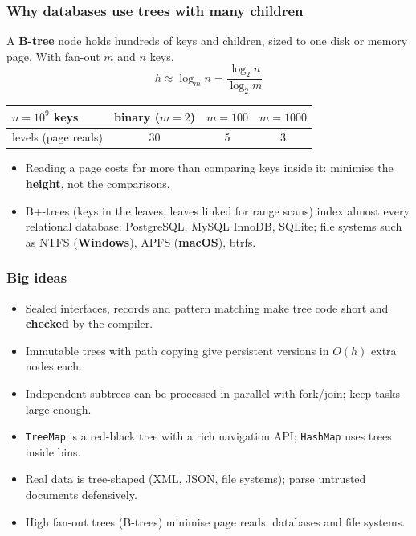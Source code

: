 \documentclass[aspectratio=169,10pt,compress]{beamer}
\newcommand{\win}{\textbf{Windows}}
\newcommand{\mac}{\textbf{macOS}}
\begin{document}
\begin{frame}[t,fragile] \frametitle{Why databases use trees with many children}
  A \textbf{B-tree} node holds hundreds of keys and children, sized to one disk or memory page. With fan-out $m$ and $n$ keys,
  \[
  	h \approx \log_{m} n = \frac{\log_{2} n}{\log_{2} m}
  \]
  \begin{center}\small
  \begin{tabular}{lccc}
    \toprule
    $n = 10^{9}$ keys          & binary ($m = 2$) & $m = 100$ & $m = 1000$ \\
    \midrule
    levels (page reads)        & 30               & 5         & 3 \\
    \bottomrule
  \end{tabular}
  \end{center}
  \begin{itemize}\small
    \item Reading a page costs far more than comparing keys inside it: minimise the \textbf{height}, not the comparisons.
    \item B+-trees (keys in the leaves, leaves linked for range scans) index almost every relational database:
          PostgreSQL, MySQL InnoDB, SQLite; file systems such as NTFS (\win), APFS (\mac), btrfs.
  \end{itemize}
\end{frame}





\begin{frame}[t,fragile] \frametitle{Big ideas}
  \begin{itemize}
    \item Sealed interfaces, records and pattern matching make tree code short and \textbf{checked} by the compiler.
    \item Immutable trees with path copying give persistent versions in $O(h)$ extra nodes each.
    \item Independent subtrees can be processed in parallel with fork/join; keep tasks large enough.
    \item \texttt{TreeMap} is a red-black tree with a rich navigation API; \texttt{HashMap} uses trees inside bins.
    \item Real data is tree-shaped (XML, JSON, file systems); parse untrusted documents defensively.
    \item High fan-out trees (B-trees) minimise page reads: databases and file systems.
  \end{itemize}
\end{frame}
\end{document}
